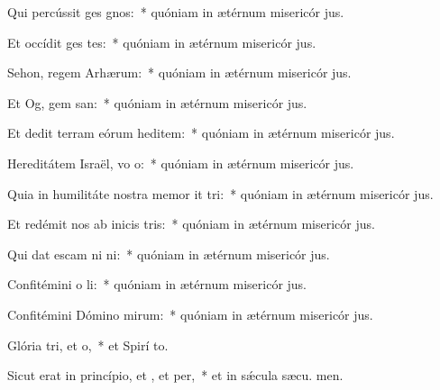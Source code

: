\item Qui percússit ges gnos:~* quóniam in ætérnum misericór jus.
\item Et occídit ges tes:~* quóniam in ætérnum misericór jus.
\item Sehon, regem Arhærum:~* quóniam in ætérnum misericór jus.
\item Et Og, gem san:~* quóniam in ætérnum misericór jus.
\item Et dedit terram eórum heditem:~* quóniam in ætérnum misericór jus.
\item Hereditátem Israël, vo o:~* quóniam in ætérnum misericór jus.
\item Quia in humilitáte nostra memor it tri:~* quóniam in ætérnum misericór jus.
\item Et redémit nos ab inicis tris:~* quóniam in ætérnum misericór jus.
\item Qui dat escam ni ni:~* quóniam in ætérnum misericór jus.
\item Confitémini o li:~* quóniam in ætérnum misericór jus.
\item Confitémini Dómino mirum:~* quóniam in ætérnum misericór jus.
\item Glória tri, et o,~* et Spirí to.
\item Sicut erat in princípio, et , et per,~* et in sǽcula sæcu. men.
